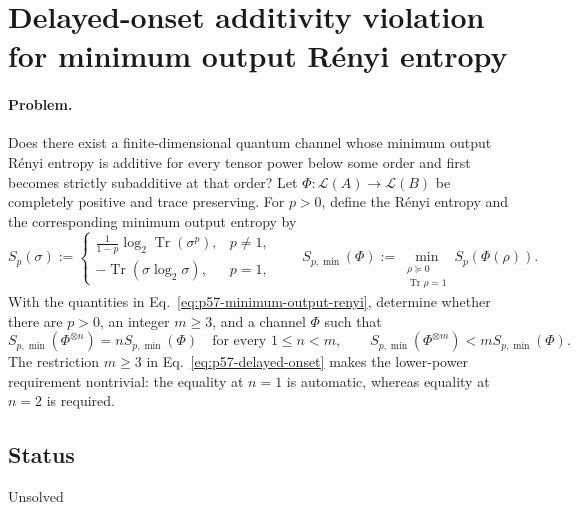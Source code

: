 \section{Delayed-onset additivity violation for minimum output R\'enyi entropy}
\label{sec:op_c0b1045a614d2353}

\paragraph{Problem.}
Does there exist a finite-dimensional quantum channel whose minimum output
R\'enyi entropy is additive for every tensor power below some order and first
becomes strictly subadditive at that order?  Let
$\Phi:\mathcal L(A)\to\mathcal L(B)$ be completely positive and trace
preserving.  For $p>0$, define the R\'enyi entropy and the corresponding
minimum output entropy by
\begin{equation}
  S_p(\sigma)
  :=\begin{cases}
    \displaystyle\frac{1}{1-p}\log_2\operatorname{Tr}(\sigma^p),
      &p\neq1,\\[2mm]
    -\operatorname{Tr}(\sigma\log_2\sigma),&p=1,
  \end{cases}
  \qquad
  S_{p,\min}(\Phi)
  :=\min_{\substack{\rho\succeq0\\\operatorname{Tr}\rho=1}}
       S_p\!\left(\Phi(\rho)\right).
  \label{eq:p57-minimum-output-renyi}
\end{equation}
With the quantities in Eq.~\eqref{eq:p57-minimum-output-renyi}, determine
whether there are $p>0$, an integer $m\geq3$, and a channel $\Phi$ such that
\begin{equation}
  S_{p,\min}(\Phi^{\otimes n})
    =nS_{p,\min}(\Phi)
    \quad\text{for every }1\leq n<m,
  \qquad
  S_{p,\min}(\Phi^{\otimes m})
    <mS_{p,\min}(\Phi).
  \label{eq:p57-delayed-onset}
\end{equation}
The restriction $m\geq3$ in Eq.~\eqref{eq:p57-delayed-onset} makes the
lower-power requirement nontrivial: the equality at $n=1$ is automatic,
whereas equality at $n=2$ is required.

\subsection*{Status}

Unsolved

